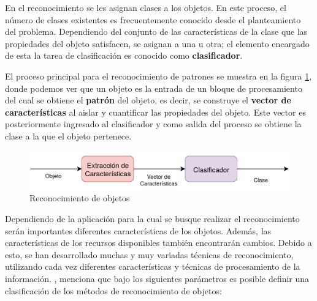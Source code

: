 En el reconocimiento se les asignan clases a los objetos. En este proceso, el número de clases existentes es frecuentemente conocido desde el planteamiento del problema. Dependiendo del conjunto de las características de la clase que las propiedades del objeto satisfacen, se asignan a una u otra; el elemento encargado de esta la tarea de clasificación es conocido como \textbf{clasificador}.

El proceso principal para el reconocimiento de patrones se muestra en la figura \ref{fig:Pat_Recog}, donde podemos ver que un objeto es la entrada de un bloque de procesamiento del cual se obtiene el \textbf{patrón} del objeto, es decir, se construye el \textbf{vector de características} al aislar y cuantificar las propiedades del objeto. Este vector es posteriormente ingresado al clasificador y como salida del proceso se obtiene la clase a la que el objeto pertenece.

\begin{figure}[H]
\centering
\includegraphics[scale=0.3]{Figures/Clasificacion.png}
    \caption{Reconocimiento de objetos}
    \label{fig:Pat_Recog}
\end{figure}

Dependiendo de la aplicación para la cual se busque realizar el reconocimiento serán importantes diferentes características de los objetos. Además, las características de los recursos disponibles también encontrarán cambios. Debido a esto, se han desarrollado muchas y muy variadas técnicas de reconocimiento, utilizando cada vez diferentes características y técnicas de procesamiento de la información. \cite{treiber_introduction_2010}, menciona que bajo los siguientes parámetros es posible definir una clasificación de los métodos de reconocimiento de objetos:

